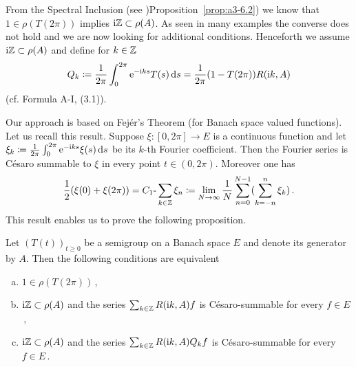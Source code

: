 From the Spectral Inclusion (see )Proposition~\ref{prop:a3-6.2}) we know that $1 \in \rho(T(2\pi))$ implies $\mathrm{i}\mathbb{Z} \subset \rho(A)$.
As seen in many examples the converse does not hold and we are now looking for additional conditions.
Henceforth we assume $\mathrm{i}\mathbb{Z} \subset \rho(A)$ and define for $k \in \mathbb{Z}$
\begin{equation}\label{eq:a3-7.7}
Q_{k}\coloneqq \frac{1}{2\pi}\int_{0}^{2\pi} \mathrm{e}^{-\mathrm{i} ks}T(s)\mathop{}\!\mathrm{d}{s} = \frac{1}{2\pi}(1 - T(2\pi))R(\mathrm{i} k,A)
\end{equation}
(cf. Formula A-I, (3.1)).

Our approach is based on Fejér's Theorem (for Banach space valued functions).
Let us recall this result.
Suppose $\xi \colon [0,2\pi] \to E$ is a continuous function and let $\xi_{k}\coloneqq \frac{1}{2\pi}\int_{0}^{2\pi} \mathrm{e}^{-\mathrm{i} ks}\xi(s)\mathop{}\!\mathrm{d}{s}$ be its $k$-th Fourier coefficient.
Then the Fourier series is Césaro summable to $\xi$ in every point $t \in (0,2\pi)$.
Moreover one has
\begin{equation}\label{eq:a3-7.8}
\frac{1}{2}(\xi(0) + \xi(2\pi)) = C_{1}\text{-}\sum_{k\in\mathbb{Z}} \xi_{n} \coloneqq \lim_{N\to\infty} \frac{1}{N}\sum_{n=0}^{N-1}(\sum_{k=-n}^{n} \xi_{k})\,.
\end{equation}
This result enables us to prove the following proposition.
\begin{proposition}\label{prop:a3-7.8}
Let $(T(t))_{t\geq 0}$ be a semigroup on a Banach space $E$ and denote its generator by $A$.
Then the following conditions are equivalent
\begin{enumerate}[(a)]
\item $1 \in \rho(T(2\pi))$\,,

\item 
$\mathrm{i}\mathbb{Z} \subset \rho(A)$ and the series $\sum_{k\in\mathbb{Z}} R(\mathrm{i} k,A)f$ is Césaro-summable for every $f \in E$\,,

\item 
$\mathrm{i}\mathbb{Z} \subset \rho(A)$ and the series $\sum_{k\in\mathbb{Z}} R(\mathrm{i} k,A)Q_{k}f$ is Césaro-summable for every $f \in E$\,.

\end{enumerate}
\end{proposition}
